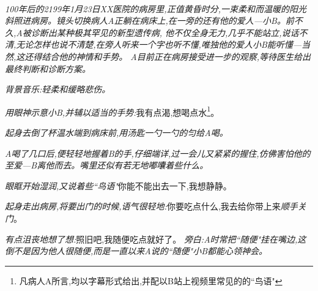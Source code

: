 \documentclass[11pt,a4paper,oneside]{memoir}  %
\begin{document}
  \begin{description}[itemsep=1ex,leftmargin=1cm]
    
    \item[] \hfill \\
    \textit{100年后的2199年1月23日\textup{XX}医院的病房里,正值黄昏时分,一束柔和而温暖的阳光斜照进病房。\textit{镜头切换}病人\textup{A}正躺在病床上,在一旁的还有他的爱人---小\textup{B}。前不久,\textup{A}被诊断出某种极其罕见的新型遗传病,
    他不仅全身无力,几乎不能站立,说话不清,无论怎样也说不清楚,在旁人听来一个字也听不懂,唯独他的爱人小\textup{B}能听懂---当然,这还得结合他的神情和手势。
    \textup{A}目前正在病房接受进一步的观察,等待医生给出最终判断和诊断方案。}

    \textit{背景音乐:轻柔\hspace{2em}和缓\hspace{2em}略悲伤。}

    \item[病人A] \textit{用眼神示意小\textup{B},并辅以适当的手势:}我有点渴,想喝点水\footnote{凡病人A所言,均以字幕形式给出,并配以B站上视频里常见的的``鸟语"}。    
    \item[小B] \textit{起身去倒了杯温水端到病床前,用汤匙一勺一勺的匀给\textup{A}喝。}

    \textit{ \textup{A}喝了几口后,便轻轻地握着\textup{B}的手,仔细端详,过一会儿又紧紧的握住,仿佛害怕他的至爱---\textup{B}离他而去。嘴里还似有若无地嘟囔着些什么。}
    \item[病人A] \textit{眼眶开始湿润,又说着些``鸟语"}你能不能出去一下,我想静静。    
    \item[小B] \textit{起身走出病房,将要出门的时候,语气很轻地:}你要吃点什么,我去给你带上来\textit{顺手关门}。
    \item[病人A] \textit{有点沮丧地想了想:}照旧吧,我随便吃点就好了。
    \textit{旁白:\textup{A}时常把``随便"挂在嘴边,这倒不是因为他人很随便,而是一直以来\textup{A}说的``随便"小\textup{B}都能心领神会。}    
\end{description}
\vskip 1cm  %
  
\end{document}
